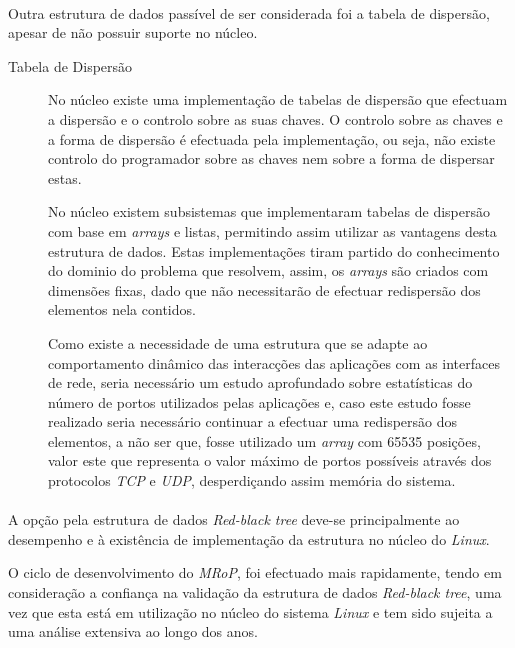 \paragraph*{}
Outra estrutura de dados passível de ser considerada foi a tabela de dispersão, apesar de não possuir suporte no núcleo.

\begin{description}
\item[Tabela de Dispersão]
No núcleo existe uma implementação de tabelas de dispersão que efectuam a dispersão e o controlo sobre as suas chaves.
O controlo sobre as chaves e a forma de dispersão é efectuada pela implementação, ou seja, não existe controlo do programador sobre as chaves nem sobre a forma de dispersar estas.

No núcleo existem subsistemas que implementaram tabelas de dispersão com base em \textit{arrays} e listas, permitindo assim utilizar as vantagens desta estrutura de dados.
Estas implementações tiram partido do conhecimento do dominio do problema que resolvem, assim, os \textit{arrays} são criados com dimensões fixas, dado que não necessitarão de efectuar redispersão dos elementos nela contidos.

Como existe a necessidade de uma estrutura que se adapte ao comportamento dinâmico das interacções das aplicações com as interfaces de rede, seria necessário um estudo aprofundado sobre estatísticas do número de portos utilizados pelas aplicações e, caso este estudo fosse realizado seria necessário continuar a efectuar uma redispersão dos elementos, a não ser que, fosse utilizado um \textit{array} com 65535 posições, valor este que representa o valor máximo de portos possíveis através dos protocolos \textit{TCP} e \textit{UDP}, desperdiçando assim memória do sistema.


\end{description}
\paragraph*{}
A opção pela estrutura de dados \textit{Red-black tree} deve-se principalmente ao desempenho e à existência de implementação da estrutura no núcleo do \textit{Linux}.

O ciclo de desenvolvimento do \textit{MRoP}, foi efectuado mais rapidamente, tendo em consideração a confiança na validação da estrutura de dados \textit{Red-black tree}, uma vez que esta está em utilização no núcleo do sistema \textit{Linux} e tem sido sujeita a uma análise extensiva ao longo dos anos.
 
